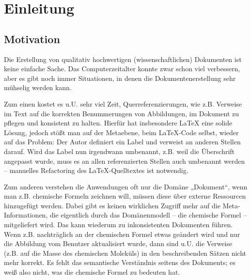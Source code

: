 \newcommand{\scaltex}{Scaltex's Latex Projection}
 
 
\chapter{Einleitung}\label{}
 
\section{Motivation}\label{}
 
Die Erstellung von qualitativ hochwertigen (wissenschaftlichen) Dokumenten ist keine einfache Sache. Das Computerzeitalter konnte zwar schon viel verbessern, aber es gibt noch immer Situationen, in denen die Dokumentenerstellung sehr mühselig werden kann.

 
Zum einen kostet es u.U. sehr viel Zeit, Querreferenzierungen, wie z.B. Verweise im Text auf die korrekten Benummerungen von Abbildungen, im Dokument zu pflegen und konsistent zu halten. Hierfür hat insbesondere LaTeX eine solide Lösung, jedoch stößt man auf der Metaebene, beim LaTeX-Code selbst, wieder auf das Problem: Der Autor definiert ein Label und verweist an anderen Stellen darauf. Wird das Label nun irgendwann umbenannt, z.B. weil die Überschrift angepasst wurde, muss es an allen referenzierten Stellen auch umbenannt werden -- manuelles Refactoring des LaTeX-Quelltextes ist notwendig.

 
Zum anderen verstehen die Anwendungen oft nur die Domäne „Dokument“, wenn man z.B. chemische Formeln zeichnen will, müssen diese über externe Ressourcen hinzugefügt werden. Dabei gibt es keinen wirklichen Zugriff mehr auf die Meta-Informationen, die eigentlich durch das Domänenmodell -- die chemische Formel -- mitgeliefert wird. Das kann wiederum zu inkonsistenten Dokumenten führen. Wenn z.B. nachträglich an der chemischen Formel etwas geändert wird und nur die Abbildung vom Benutzer aktualisiert wurde, dann sind u.U. die Verweise (z.B. auf die Masse des chemischen Moleküls) in den beschreibenden Sätzen nicht mehr korrekt. Es fehlt das semantische Verständnis seitens des Dokuments; es weiß also nicht, was die chemische Formel zu bedeuten hat.

